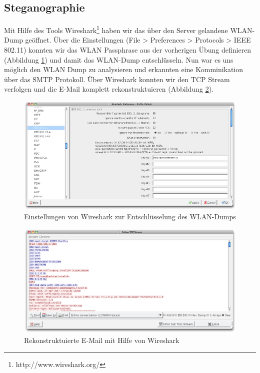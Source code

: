 \documentclass[12pt]{article}
\begin{document}
\subsection{Steganographie}
Mit Hilfe des Tools Wireshark\footnote{http://www.wireshark.org/} haben wir das über den Server gelandene WLAN-Dump geöffnet. Über die Einstellungen (File > Preferences > Protocols > IEEE 802.11) konnten wir das WLAN Passphrase aus der vorherigen Übung definieren (Abbildung \ref{stegConfig}) und damit das WLAN-Dump entschlüsseln. Nun war es uns möglich den WLAN Dump zu analysieren und erkannten eine Komminikation über das SMTP Protokoll. Über Wireshark konnten wir den TCP Stream verfolgen und die E-Mail komplett rekonstruktuieren (Abbildung \ref{stegMail}).
 \begin{figure}
  \begin{center}
    \includegraphics[scale=0.3]{images/stegConfig.png}
  \end{center}
  \caption{Einstellungen von Wireshark zur Entschlüsselung des WLAN-Dumps}
  \label{stegConfig}
\end{figure}
 \begin{figure}
  \begin{center}
    \includegraphics[scale=0.3]{images/stegMail.png}
  \end{center}
  \caption{Rekonstruktuierte E-Mail mit Hilfe von Wireshark}
  \label{stegMail}
\end{figure}
\end{document}
